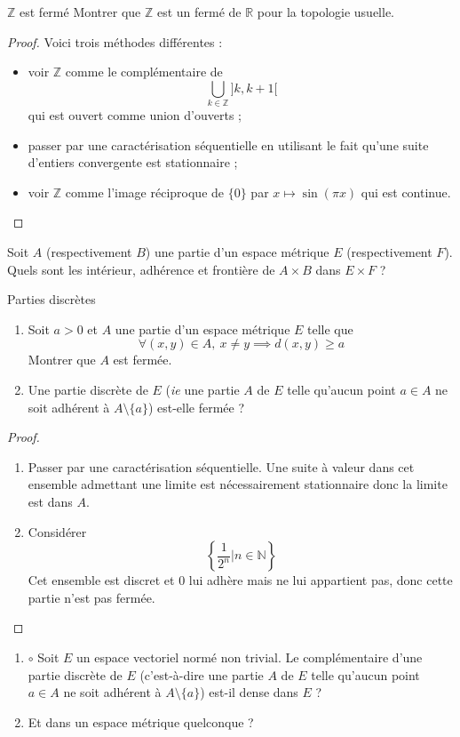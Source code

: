 \documentclass[french,a4paper]{article}
\newcommand{\N}{\mathbb{N}}
\newcommand{\Z}{\mathbb{Z}}
\newcommand{\R}{\mathbb{R}}
\theoremstyle{plain}
\theoremstyle{definition}
\theoremstyle{remark}
\begin{document}
\begin{ex}{$\Z$ est fermé}
	Montrer que $\Z$ est un fermé de $\R$ pour la topologie usuelle.
\end{ex}
\begin{proof}
	Voici trois méthodes différentes :
	\begin{itemize}
		\item voir $\Z$ comme le complémentaire de $$\bigcup_{k\in\Z}]k,k+1[$$ qui est ouvert comme union d'ouverts ;
		\item passer par une caractérisation séquentielle en utilisant le fait qu'une suite d'entiers convergente est stationnaire ;
		\item voir $\Z$ comme l'image réciproque de $\{0\}$ par $x\mapsto\sin(\pi x)$ qui est continue.
	\end{itemize}
\end{proof}

\begin{ex}{}
	Soit $A$ (respectivement $B$) une partie d'un espace métrique $E$ (respectivement $F$). Quels sont les intérieur, adhérence et frontière de $A\times B$ dans $E\times F$ ?
\end{ex}

\begin{ex}{Parties discrètes}
	\begin{enumerate}
		\item Soit $a>0$ et $A$ une partie d'un espace métrique $E$ telle que $$\forall(x,y)\in A,\ x\ne y\implies d(x,y)\geqslant a$$ Montrer que $A$ est fermée.
		\item Une partie discrète de $E$ (\textit{ie} une partie $A$ de $E$ telle qu'aucun point $a\in A$ ne soit adhérent à $A\setminus\{a\}$) est-elle fermée ?
	\end{enumerate}
\end{ex}
\begin{proof}
	\begin{enumerate}
		\item Passer par une caractérisation séquentielle. Une suite à valeur dans cet ensemble admettant une limite est nécessairement stationnaire donc la limite est dans $A$.
		\item Considérer $$\left\{\frac{1}{2^n}\bigg|n\in\N\right\}$$ Cet ensemble est discret et $0$ lui adhère mais ne lui appartient pas, donc cette partie n'est pas fermée.
	\end{enumerate}
\end{proof}

\begin{ex}{}
	\begin{enumerate}
		\item $\circ$ Soit $E$ un espace vectoriel normé non trivial. Le complémentaire d'une partie discrète de $E$ (c'est-à-dire une partie $A$ de $E$ telle qu'aucun point $a\in A$ ne soit adhérent à $A\setminus\{a\}$) est-il dense dans $E$ ?
		\item Et dans un espace métrique quelconque ?
	\end{enumerate}
\end{ex}
\end{document}
